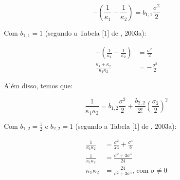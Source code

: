 \begin{equation}
\label{apV_eq:3}
- \left( \frac{1}{\kappa_{1}} - \frac{1}{\kappa_{2}} \right) = b_{1,1} \frac{\sigma^{2}}{2}
\end{equation}

Com $b_{1,1} = 1$ (segundo a Tabela [1] de , 2003a):



\begin{align}
\label{apV_eq:4}
- \left( \frac{1}{\kappa_{1}} - \frac{1}{\kappa_{2}} \right) & = \frac{\sigma^{2}}{2} \\
\label{apV_eq:5}
\frac{\kappa_{1} + \kappa_{2}}{\kappa_{1}\kappa_{2}} & = - \frac{\sigma^{2}}{2}
\end{align}

Além disso, temos que:

\begin{equation}
\label{apV_eq:6}
\frac{1}{\kappa_{1}\kappa_{2}} = b_{1,2} \frac{\sigma^{2}}{2} + \frac{b_{2,2}}{2!}\left(  \frac{\sigma_{2}}{2} \right)^{2}
\end{equation}

Com $b_{1,2} = \frac{1}{2}$ e $b_{2,2} = 1$ (segundo a Tabela [1] de , 2003a):




\begin{align}
\label{apV_eq:7}
\frac{1}{\kappa_{1}\kappa_{2}} & = \frac{\sigma^{2}}{24} + \frac{\sigma^{4}}{8} \\
\label{apV_eq:8}
\frac{1}{\kappa_{1}\kappa_{2}} & = \frac{\sigma^{2} + 3\sigma^{4}}{24} \\
\label{apV_eq:9}
\kappa_{1}\kappa_{2} & = \frac{24}{\sigma^{2} + 3\sigma^{4}} \text{, com $\sigma \neq 0$}
\end{align}

